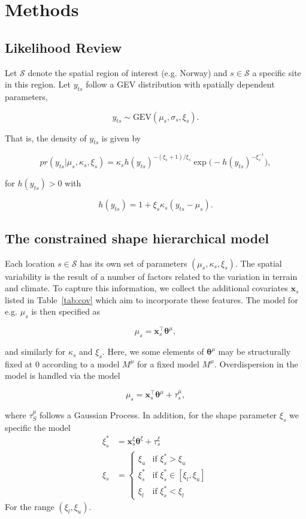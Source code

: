 \documentclass[11pt,english]{article}
\newcommand{\bs}[1]{\boldsymbol{#1}}
\newcommand{\bl}{\begin{linenomath}}
\newcommand{\el}{\end{linenomath}}
\begin{document}
\section{Methods}\label{sec:modeling}

\subsection{Likelihood Review}
Let $\mathcal{S}$ denote the spatial region of interest (e.g. Norway) and $s\in\mathcal{S}$ a specific site in this region.  Let $y_{ts}$ follow a GEV distribution with spatially dependent parameters, 
\bl\[
y_{ts} \sim \text{GEV}(\mu_s,\sigma_s,\xi_s). 
\]\el
That is, the density of $y_{ts}$ is given by 
\bl\begin{equation}\label{eq:gev_density}
pr(y_{ts}| \mu_s, \kappa_s, \xi_s) = \kappa_s h(y_{ts})^{-(\xi_s + 1)/\xi_s} \exp \Big( - h(y_{ts})^{-\xi_s^{-1}}\Big), 
\end{equation}\el
for $h(y_{ts}) > 0$ with 
\bl\[
h(y_{ts}) = 1 + \xi_s \kappa_s (y_{ts} - \mu_s).
\]\el

\subsection{The constrained shape hierarchical model}\label{sec:gp}

Each location $s \in\mathcal{S}$ has its own set of parameters $(\mu_s, \kappa_s, \xi_s)$.  The spatial variability is the result of a number of factors related to the variation in terrain and climate.  To capture this information, we collect the additional covariates $\bs{x}_{s}$ listed in Table~\ref{tab:cov} which aim to incorporate these features.  The model for e.g. $\mu_s$ is then specified as
\bl\begin{equation}
\mu_s = \bs{x}^\top_s\bs{\theta}^{\mu} \label{eq:glm}, 
\end{equation}\el
and similarly for $\kappa_s$ and $\xi_s$. Here, we some elements of $\bs{\theta}^{\mu}$ may be structurally fixed at $0$ according to a model $M^{\mu}$ for a fixed model $M^\mu$. Overdispersion in the model is handled via the model
\bl\begin{equation}\label{eq:mu model}
\mu_s = \bs{x}^\top_s \bs{\theta}^\mu + \tau^{\mu}_s,
\end{equation}\el
where $\tau^\mu_S$ follows a Gaussian Process.  In addition, for the shape parameter $\xi_s$ we specific the model
\begin{align*}
  \xi_s^{*} &= \bs{x}_s^\xi \bs{\theta}^\xi + \tau^{\xi}_s\\
  \xi_s &=  \left\{\begin{array}{ll}
  \xi_u&\mbox{if }\xi^{*}_s > \xi_u\\
  \xi^{*}_s&\mbox{if }\xi^{*}_s \in [\xi_l,\xi_u]\\
  \xi_l&\mbox{if }\xi^{*}_s < \xi_l
  \end{array}
  \right.
\end{align*}
For the range $(\xi_l, \xi_u)$.
\end{document}

